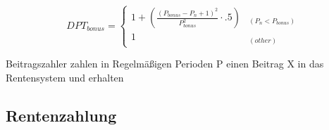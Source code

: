 \begin{equation}
DPT_{bonus} = \begin{cases} 
1 + (\frac{(P_{bonus} - P_{n} + 1)^2}
      {P_{bonus}^2} \cdot .5) & _{(P_{n} < P_{bonus})} \\
1 & _{(other)} 
\end{cases}
\end{equation}







Beitragszahler zahlen in Regelmäßigen Perioden P einen Beitrag X in das Rentensystem und erhalten 

\subsection{Rentenzahlung}

%
